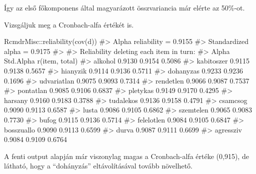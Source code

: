 \documentclass[
  letterpaper,
]{krantz}
\makeatletter
\newenvironment{Shaded}{\begin{snugshade}}{\end{snugshade}}
\newcommand{\CommentTok}[1]{\textcolor[rgb]{0.37,0.37,0.37}{#1}}
\newcommand{\FunctionTok}[1]{\textcolor[rgb]{0.28,0.35,0.67}{#1}}
\newcommand{\NormalTok}[1]{\textcolor[rgb]{0.00,0.23,0.31}{#1}}
\newcommand{\SpecialCharTok}[1]{\textcolor[rgb]{0.37,0.37,0.37}{#1}}
\newenvironment{kframe}{%
\medskip{}
\setlength{\fboxsep}{.8em}
 \def\at@end@of@kframe{}%
 \ifinner\ifhmode%
  \def\at@end@of@kframe{\end{minipage}}%
  \begin{minipage}{\columnwidth}%
 \fi\fi%
 \def\FrameCommand##1{\hskip\@totalleftmargin \hskip-\fboxsep
 \colorbox{shadecolor}{##1}\hskip-\fboxsep
     \hskip-\linewidth \hskip-\@totalleftmargin \hskip\columnwidth}%
 \MakeFramed {\advance\hsize-\width
   \@totalleftmargin\z@ \linewidth\hsize
   \@setminipage}}%
 {\par\unskip\endMakeFramed%
 \at@end@of@kframe}
\renewenvironment{Shaded}{\begin{kframe}}{\end{kframe}}
\makeatother
\begin{document}
Így az első főkomponens által magyarázott összvariancia már elérte az
50\%-ot.

Vizsgáljuk meg a Cronbach-alfa értékét is.

\begin{Shaded}
\begin{Highlighting}[]
\NormalTok{RcmdrMisc}\SpecialCharTok{::}\FunctionTok{reliability}\NormalTok{(}\FunctionTok{cov}\NormalTok{(d))}
\CommentTok{\#\textgreater{} Alpha reliability =  0.9155 }
\CommentTok{\#\textgreater{} Standardized alpha =  0.9175 }
\CommentTok{\#\textgreater{} }
\CommentTok{\#\textgreater{} Reliability deleting each item in turn:}
\CommentTok{\#\textgreater{}              Alpha Std.Alpha r(item, total)}
\CommentTok{\#\textgreater{} alkohol     0.9130    0.9154         0.5086}
\CommentTok{\#\textgreater{} kabitoszer  0.9115    0.9138         0.5657}
\CommentTok{\#\textgreater{} hianyzik    0.9114    0.9136         0.5711}
\CommentTok{\#\textgreater{} dohanyzas   0.9233    0.9236         0.1696}
\CommentTok{\#\textgreater{} udvariatlan 0.9075    0.9093         0.7314}
\CommentTok{\#\textgreater{} rendetlen   0.9066    0.9087         0.7537}
\CommentTok{\#\textgreater{} pontatlan   0.9085    0.9106         0.6837}
\CommentTok{\#\textgreater{} pletykas    0.9149    0.9170         0.4295}
\CommentTok{\#\textgreater{} harsany     0.9160    0.9183         0.3788}
\CommentTok{\#\textgreater{} tudalekos   0.9136    0.9158         0.4791}
\CommentTok{\#\textgreater{} csamcsog    0.9090    0.9113         0.6587}
\CommentTok{\#\textgreater{} lusta       0.9086    0.9105         0.6862}
\CommentTok{\#\textgreater{} szemtelen   0.9065    0.9083         0.7730}
\CommentTok{\#\textgreater{} bufog       0.9115    0.9136         0.5714}
\CommentTok{\#\textgreater{} felelotlen  0.9084    0.9105         0.6847}
\CommentTok{\#\textgreater{} bosszuallo  0.9090    0.9113         0.6599}
\CommentTok{\#\textgreater{} durva       0.9087    0.9111         0.6699}
\CommentTok{\#\textgreater{} agressziv   0.9084    0.9109         0.6764}
\end{Highlighting}
\end{Shaded}

A fenti output alapján már viszonylag magas a Cronbach-alfa értéke
(0,915), de látható, hogy a ``dohányzás'' eltávolításával tovább
növelhető.
\end{document}
